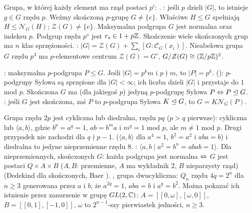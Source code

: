 Grupa, w  której każdy element ma rząd postaci $p^i$: .
: jeśli $p$ dzieli $|G|$, to istnieje $g \in G$ rzędu $p$.
Weźmy skończoną $p$-grupę $G \neq \{e\}$.
Właściwe $H \le G$ spełniają $H \le \mathcal N_G(H)$;
$\mathcal Z(G) \neq \{e\}$.
Maksymalna podgrupa $G$ jest normalna oraz indeksu $p$.
Podgrup rzędu $p^s$ jest $r_s \in 1 + p\mathbb{Z}$.
Skończenie wiele skończonych grup ma $n$ klas sprzężoności.
: $|G| = \mathcal Z(G) + \sum_i [G : \mathcal C_G(x_i)]$.
Nieabelowa grupa $G$ rzędu $p^3$ ma $p$-elementowe centrum $\mathcal Z(G) = G'$, $G/\mathcal Z(G) \cong (\mathbb{Z}/p\mathbb{Z})^2$.

:  maksymalna $p$-podgrupa $P \le G$.
Jeśli $|G| = p^km$ i $p \nmid m$, to $|P| = p^k$.
 (): $p$-podgrupy Sylowa są sprzężone dla $|G| < \infty$; ich liczba dzieli $|G|$ i przystaje do $1$ mod $p$.
Skończona $G$ ma (dla jakiegoś $p$) jedyną $p$-podgrupę Sylowa $P \Leftrightarrow P \trianglelefteq G$.
: jeśli $G$ jest skończona, zaś $P$ to $p$-podgrupa Sylowa $K \trianglelefteq G$, to $G = K\mathcal N_G(P)$.

Grupa  rzędu $2p$ jest cykliczna lub diedralna, rzędu $pq$ ($p > q$ pierwsze): cykliczna lub $\langle a,b \rangle$, gdzie $b^p = a^q = 1$, $ab=b^ma$ i $m^q = 1$ mod $p$, ale $m \neq 1$ mod $p$.
Drugi przypadek nie zachodzi dla $q \nmid p - 1$.
 ($\langle a, b \rangle$ dla $a^4 = 1$, $b^2 = a^2$ i $aba = b$) i diedralna to jedyne nieprzemienne rzędu $8$.
: $\langle a , b \mid a^2 = b^n = abab = 1 \rangle$.
Dla nieprzemiennych, skończonych $G$: każda podgrupa jest normalna $\Leftrightarrow$ $G$ jest postaci $Q \times A \times B$ ($A, B$: przemienne, $A$ ma wykładnik $2$, $B$ nieparzysty rząd) (Dedekind  dla skończonych, Baer ).
, grupa dwucykliczna: $Q_n$ rzędu $4q = 2^n$ dla $n \ge 3$ generowana przez $a$ i $b$, że $a^{2q} = 1$, $aba = b$ i $a^q = b^2$.
Można pokazać ich istnienie przez zanurzenie w grupę $GL(2, \mathbb{C})$: $A = [[0, \omega], [\omega, 0]]$, $B = [[0, 1], [-1, 0]]$, $\omega$ to $2^{n-1}$-szy pierwiastek jedności, $n \ge 3$.